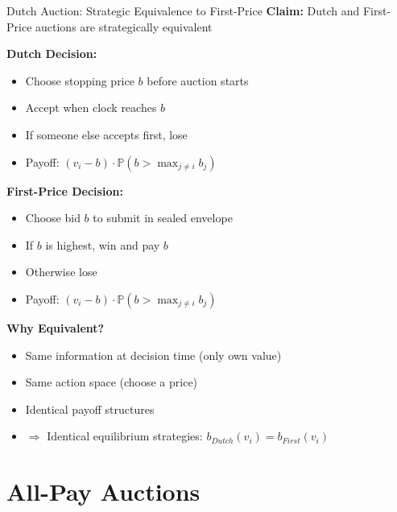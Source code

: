 \documentclass[xcolor={x11names}, aspectratio=169 ]{beamer}
\begin{document}
\begin{frame}{Dutch Auction: Strategic Equivalence to First-Price}
\textbf{Claim:} Dutch and First-Price auctions are strategically equivalent

\textbf{Dutch Decision:}
\begin{itemize}
  \item Choose stopping price $b$ before auction starts
  \item Accept when clock reaches $b$
  \item If someone else accepts first, lose
  \item Payoff: $(v_i - b) \cdot \mathbb{P}(b > \max_{j \neq i} b_j)$
\end{itemize}

\textbf{First-Price Decision:}
\begin{itemize}
  \item Choose bid $b$ to submit in sealed envelope
  \item If $b$ is highest, win and pay $b$
  \item Otherwise lose
  \item Payoff: $(v_i - b) \cdot \mathbb{P}(b > \max_{j \neq i} b_j)$
\end{itemize}

\textbf{Why Equivalent?}
\begin{itemize}
  \item Same information at decision time (only own value)
  \item Same action space (choose a price)
  \item Identical payoff structures
  \item $\Rightarrow$ Identical equilibrium strategies: $b_{Dutch}(v_i) = b_{First}(v_i)$
\end{itemize}
\end{frame}


\section{All-Pay Auctions}
\end{document}
